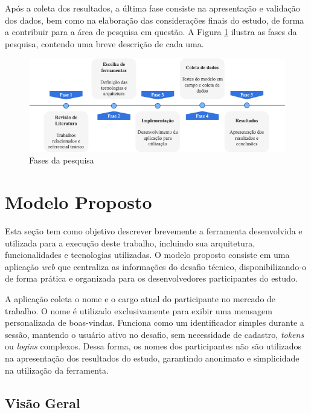 \documentclass[english,brazilian]{UNISINOSartigo} %
\begin{document}
Após a coleta dos resultados, a última fase consiste na apresentação e validação dos dados, bem como na elaboração das considerações finais do estudo, de forma a contribuir para a área de pesquisa em questão. A Figura \ref{fig:fases_pesquisa} ilustra as fases da pesquisa, contendo uma breve descrição de cada uma.

\begin{figure}[ht]
    \caption{Fases da pesquisa}
    \label{fig:fases_pesquisa}
    \centering%
    \footnotesize
	\begin{minipage}{.9\textwidth}
		\includegraphics[width=\textwidth]{images/fases_pesquisa.png}
	\end{minipage}
\end{figure}
\FloatBarrier

\section{Modelo Proposto}

Esta seção tem como objetivo descrever brevemente a ferramenta desenvolvida e utilizada para a execução deste trabalho, incluindo sua arquitetura, funcionalidades e tecnologias utilizadas. O modelo proposto consiste em uma aplicação \textit{web} que centraliza as informações do desafio técnico, disponibilizando-o de forma prática e organizada para os desenvolvedores participantes do estudo.

A aplicação coleta o nome e o cargo atual do participante no mercado de trabalho. O nome é utilizado exclusivamente para exibir uma mensagem personalizada de boas-vindas. Funciona como um identificador simples durante a sessão, mantendo o usuário ativo no desafio, sem necessidade de cadastro, \textit{tokens} ou \textit{logins} complexos. Dessa forma, os nomes dos participantes não são utilizados na apresentação dos resultados do estudo, garantindo anonimato e simplicidade na utilização da ferramenta.

\subsection{Visão Geral}
\end{document}
